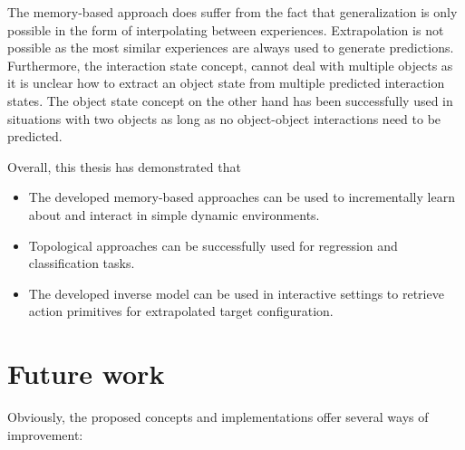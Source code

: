 The memory-based approach does suffer from the fact that generalization is only possible in the form of interpolating between experiences. Extrapolation is not possible as the most similar experiences are always used to generate predictions.
Furthermore, the interaction state concept, cannot deal with multiple objects as it is unclear how to extract an object state from multiple predicted interaction states.
The object state concept on the other hand has been successfully used in situations with two objects as long as no object-object interactions need to be predicted.

Overall, this thesis has demonstrated that 

\begin{itemize}
\item The developed memory-based approaches can be used to incrementally learn about and interact in simple dynamic environments. 
\item Topological approaches can be successfully used for regression and classification tasks.
\item The developed inverse model can be used in interactive settings to retrieve action primitives for extrapolated target configuration.
\end{itemize} 


\section{Future work}

Obviously, the proposed concepts and implementations offer several ways of improvement:

